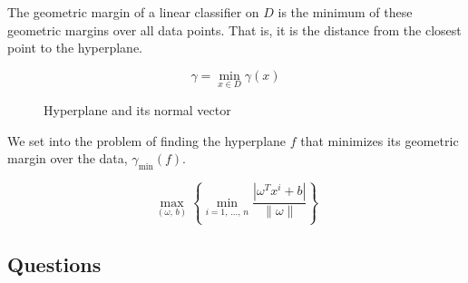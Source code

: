 The geometric margin of a linear classifier on $D$ is the minimum of
these geometric margins over all data points. That is, it is the distance
from the closest point to the hyperplane.

\begin{equation*}
	\gamma = \min_{x \in D} \gamma(x) \tag{geometric margin of a linear classifier}
\end{equation*}

\begin{figure}[H]
	\caption{Hyperplane and its normal vector}
\end{figure}

We set into the problem of finding the hyperplane $f$ that minimizes
its geometric margin over the data, $\gamma_{\text{min}}(f)$.

\begin{equation*}
	\max_{(\omega,\, b)}
	\left\{
	\min_{i=1,\,\dots,\, n}
	\frac{| \omega^Tx^i + b |}{\lVert\omega\rVert}
	\right\}
\end{equation*}

\subsection*{Questions}

